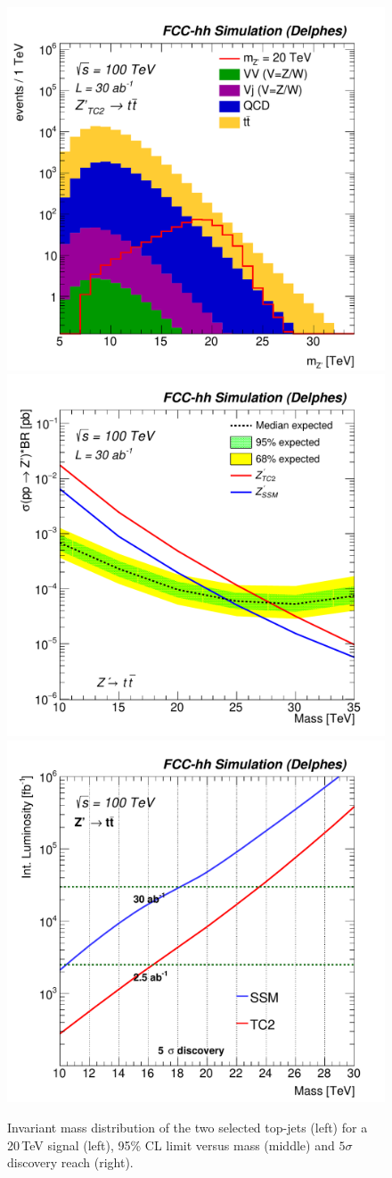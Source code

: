 \begin{figure}[!htb]
  \centering
   \includegraphics[width=0.32\columnwidth]{Fig/Mj1j2_pf08_MetCorr_fit_sel8_nostack_log-eps-converted-to.pdf}
   \includegraphics[width=0.32\columnwidth]{Fig/lim_Zprime_tt_fcc_v02-eps-converted-to.pdf}
   \includegraphics[width=0.32\columnwidth]{Fig/DiscoveryPotential_tt_SSM_TC2_tagger_TRFbtag_rootStyle-eps-converted-to.pdf}
  \caption{Invariant mass distribution of the two selected top-jets (left) for a 20\,TeV signal (left), 95\% CL limit versus mass (middle) and $5\sigma$ discovery reach (right).}
  \label{figure:hadronicresonances:tt}
\end{figure}


